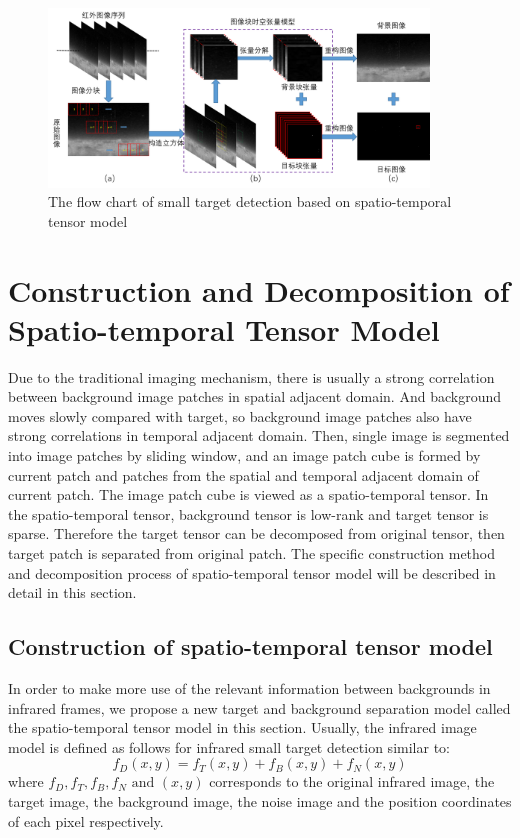 \documentclass[journal]{IEEEtran}
\begin{document}
\begin{figure}[htb]
  \centering
  \includegraphics[width=0.9\textwidth]{flow_chart.png}
  \caption{The flow chart of small target detection based on spatio-temporal tensor model}
  \label{fig:flow_chart}
\end{figure}


\section{Construction and Decomposition of Spatio-temporal Tensor Model}
Due to the traditional imaging mechanism, there is usually a strong correlation between background image patches in spatial adjacent domain. And background moves slowly compared with target, so background image patches also have strong correlations in temporal adjacent domain. Then, single image is segmented into image patches by sliding window, and an image patch cube is formed by current patch and patches from the spatial and temporal adjacent domain of current patch. The image patch cube is viewed as a spatio-temporal tensor. In the spatio-temporal tensor, background tensor is low-rank and target tensor is sparse. Therefore the target tensor can be decomposed from original tensor, then target patch is separated from original patch. The specific construction method and decomposition process of spatio-temporal tensor model will be described in detail in this section.


\subsection{Construction of spatio-temporal tensor model}
In order to make more use of the relevant information between backgrounds in infrared frames, we propose a new target and background separation model called the spatio-temporal tensor model in this section. Usually, the infrared image model is defined as follows for infrared small target detection similar to\cite{gu2010kernel}:
\begin{equation}
  f_D(x,y)=f_T(x,y)+f_B(x,y)+f_N(x,y)
  \label{eq:image_model}
\end{equation}
where $f_D,f_T,f_B,f_N \text{ and } (x,y)$ corresponds to the original infrared image, the target image, the background image, the noise image and the position coordinates of each pixel respectively.
\end{document}
